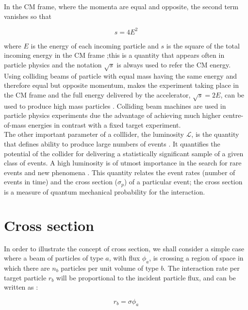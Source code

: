 In the CM frame, where the momenta are equal and opposite, the second term vanishes so that

\begin{equation*}
s= 4 E^{2}
\end{equation*}

where $E$ is the energy of each incoming particle and $s$ is the square of the total incoming energy in the CM frame ;this is a quantity that appears often in particle physics and the notation $\sqrt{s}$ is always used to refer the CM energy. Using  colliding beams of particle with equal mass having the same energy and therefore equal but opposite momentum, makes the experiment taking place in the CM frame and the full energy delivered by the accelerator, $\sqrt{s}=2E$, can be used to produce high mass particles \cite{undergraduate_accelerators_chapter}. Colliding beam machines are used in particle physics experiments due the advantage of  achieving much higher centre-of-mass energies in contrast with a fixed target experiment.\\
The other important parameter of a colllider, the luminosity $\mathcal{L}$, is the quantity that defines ability to produce large numbers of events \cite{ref_lib_vol3}. It quantifies the potential of the collider for delivering a statistically significant sample of a given class of events. A high luminosity is of utmost importance in the search for rare events and new phenomena \cite{lumi_paper_def_and_concept}. This quantity relates the event rates (number of events in time) and the cross section ($\sigma_{p}$) of a particular event; the cross section is a measure of quantum mechanical probability for the interaction. 



\section{Cross section}
In order to illustrate the concept of cross section, we shall consider a simple case where a beam of particles of type $a$, with flux $\phi_{a}$, is crossing a region of space in which there are $n_{b}$ particles per unit volume of type $b$. The interaction rate per target particle $r_{b}$ will be proportional to the incident particle flux, and can be written as \cite{thomson_2013}:

\begin{equation*}
  r_{b}=\sigma \phi_{a}
\end{equation*}

